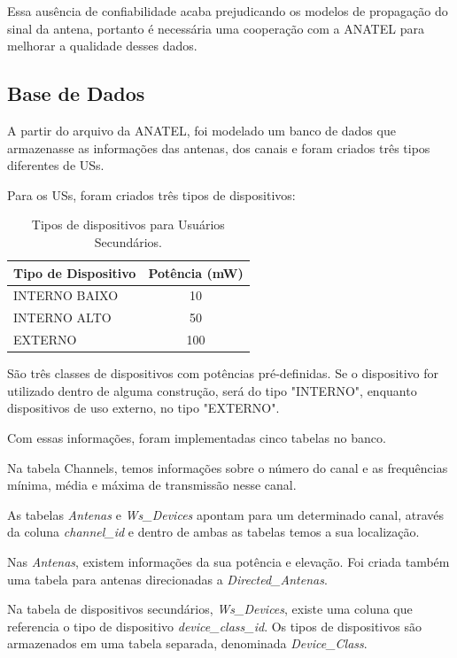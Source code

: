 Essa ausência de confiabilidade acaba prejudicando os modelos de propagação do sinal da antena, portanto é necessária uma cooperação com a ANATEL para melhorar a qualidade desses dados.

\subsection{Base de Dados}

A partir do arquivo da ANATEL, foi modelado um banco de dados que armazenasse as informações das antenas, dos canais e foram criados três tipos diferentes de USs.

Para os USs, foram criados três tipos de dispositivos:

\begin{table}[h]
\centering
\caption[Tipos de dispositivos para Usuários Secundários.]
{Tipos de dispositivos para Usuários Secundários.} 
\label{table:wstypes}
\begin{tabular}{lc}

\hline
Tipo de Dispositivo          & Potência (mW)     \\ \hline
INTERNO BAIXO                & 10                \\
INTERNO ALTO                 & 50                \\
EXTERNO                      & 100                     
\end{tabular}
\end{table}

São três classes de dispositivos com potências pré-definidas. Se o dispositivo for utilizado dentro de alguma construção, será do tipo "INTERNO", enquanto dispositivos de uso externo, no tipo "EXTERNO".

Com essas informações, foram implementadas cinco tabelas no banco.

Na tabela Channels, temos informações sobre o número do canal e as frequências mínima, média e máxima de transmissão nesse canal.

As tabelas \textit{Antenas} e \textit{Ws\_Devices} apontam para um determinado canal, através da coluna \textit{channel\_id} e dentro de ambas as tabelas temos a sua localização.

Nas \textit{Antenas}, existem informações da sua potência e elevação. Foi criada também uma tabela para antenas direcionadas a \textit{Directed\_Antenas}.

Na tabela de dispositivos secundários, \textit{Ws\_Devices}, existe uma coluna que referencia o tipo de dispositivo \textit{device\_class\_id}. Os tipos de dispositivos são armazenados em uma tabela separada, denominada \textit{Device\_Class}.

